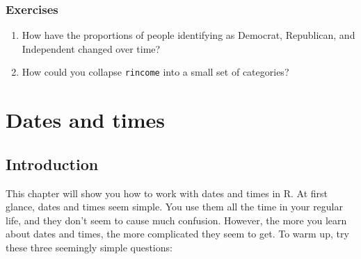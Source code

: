 \documentclass[]{book}
\newenvironment{Shaded}{\begin{snugshade}}{\end{snugshade}}
\newcommand{\KeywordTok}[1]{\textcolor[rgb]{0.13,0.29,0.53}{\textbf{{#1}}}}
\newcommand{\DataTypeTok}[1]{\textcolor[rgb]{0.13,0.29,0.53}{{#1}}}
\newcommand{\DecValTok}[1]{\textcolor[rgb]{0.00,0.00,0.81}{{#1}}}
\newcommand{\StringTok}[1]{\textcolor[rgb]{0.31,0.60,0.02}{{#1}}}
\newcommand{\CommentTok}[1]{\textcolor[rgb]{0.56,0.35,0.01}{\textit{{#1}}}}
\newcommand{\OtherTok}[1]{\textcolor[rgb]{0.56,0.35,0.01}{{#1}}}
\newcommand{\NormalTok}[1]{{#1}}
\begin{document}
\begin{Shaded}
\end{Shaded}

\subsection{Exercises}\label{exercises-44}

\begin{enumerate}
\def\labelenumi{\arabic{enumi}.}
\item
  How have the proportions of people identifying as Democrat,
  Republican, and Independent changed over time?
\item
  How could you collapse \texttt{rincome} into a small set of
  categories?
\end{enumerate}

\hypertarget{dates-and-times}{\chapter{Dates and
times}\label{dates-and-times}}

\section{Introduction}\label{introduction-10}

This chapter will show you how to work with dates and times in R. At
first glance, dates and times seem simple. You use them all the time in
your regular life, and they don't seem to cause much confusion. However,
the more you learn about dates and times, the more complicated they seem
to get. To warm up, try these three seemingly simple questions:
\end{document}

